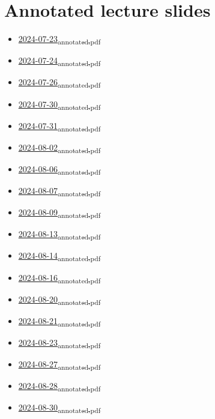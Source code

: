 \documentclass{amsart}
\begin{document}
\section{Annotated lecture slides}
\label{sec:org5107b91}
\begin{itemize}
\item \href{Lecture slides/2024-07-23\_annotated.pdf}{2024-07-23\textsubscript{annotated.pdf}}
\item \href{Lecture slides/2024-07-24\_annotated.pdf}{2024-07-24\textsubscript{annotated.pdf}}
\item \href{Lecture slides/2024-07-26\_annotated.pdf}{2024-07-26\textsubscript{annotated.pdf}}
\item \href{Lecture slides/2024-07-30\_annotated.pdf}{2024-07-30\textsubscript{annotated.pdf}}
\item \href{Lecture slides/2024-07-31\_annotated.pdf}{2024-07-31\textsubscript{annotated.pdf}}
\item \href{Lecture slides/2024-08-02\_annotated.pdf}{2024-08-02\textsubscript{annotated.pdf}}
\item \href{Lecture slides/2024-08-06\_annotated.pdf}{2024-08-06\textsubscript{annotated.pdf}}
\item \href{Lecture slides/2024-08-07\_annotated.pdf}{2024-08-07\textsubscript{annotated.pdf}}
\item \href{Lecture slides/2024-08-09\_annotated.pdf}{2024-08-09\textsubscript{annotated.pdf}}
\item \href{Lecture slides/2024-08-13\_annotated.pdf}{2024-08-13\textsubscript{annotated.pdf}}
\item \href{Lecture slides/2024-08-14\_annotated.pdf}{2024-08-14\textsubscript{annotated.pdf}}
\item \href{Lecture slides/2024-08-16\_annotated.pdf}{2024-08-16\textsubscript{annotated.pdf}}
\item \href{Lecture slides/2024-08-20\_annotated.pdf}{2024-08-20\textsubscript{annotated.pdf}}
\item \href{Lecture slides/2024-08-21\_annotated.pdf}{2024-08-21\textsubscript{annotated.pdf}}
\item \href{Lecture slides/2024-08-23\_annotated.pdf}{2024-08-23\textsubscript{annotated.pdf}}
\item \href{Lecture slides/2024-08-27\_annotated.pdf}{2024-08-27\textsubscript{annotated.pdf}}
\item \href{Lecture slides/2024-08-28\_annotated.pdf}{2024-08-28\textsubscript{annotated.pdf}}
\item \href{Lecture slides/2024-08-30\_annotated.pdf}{2024-08-30\textsubscript{annotated.pdf}}

\end{itemize}
\end{document}
